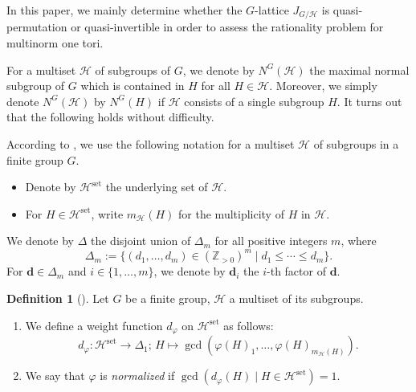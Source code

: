 \documentclass[12pt]{amsart}
\theoremstyle{plain}
\newtheorem{lem}[thm]{Lemma}
\theoremstyle{definition}
\newtheorem{dfn}[thm]{Definition}
\numberwithin{thm}{section}
\numberwithin{equation}{section}
\newcommand{\Zpn}{\mathbb{Z}_{>0}}
\newcommand{\bd}{\mathbf{d}}
\newcommand{\cH}{\mathcal{H}}
\DeclareMathOperator{\set}{set}
\begin{document}
In this paper, we mainly determine whether the $G$-lattice $J_{G/\cH}$ is quasi-permutation or quasi-invertible in order to assess the rationality problem for multinorm one tori.

For a multiset $\cH$ of subgroups of $G$, we denote by $N^{G}(\cH)$ the maximal normal subgroup of $G$ which is contained in $H$ for all $H\in \cH$. Moreover, we simply denote $N^{G}(\cH)$ by $N^{G}(H)$ if $\cH$ consists of a single subgroup $H$. It turns out that the following holds without difficulty. 

According to \cite{Hasegawa}, we use the following notation for a multiset $\cH$ of subgroups in a finite group $G$. 
\begin{itemize}
\item Denote by $\cH^{\set}$ the underlying set of $\cH$. 
\item For $H\in \cH^{\set}$, write $m_{\cH}(H)$ for the multiplicity of $H$ in $\cH$. 
\end{itemize}
We denote by $\Delta$ the disjoint union of $\Delta_{m}$ for all positive integers $m$, where
\begin{equation*}
\Delta_{m}:=\{(d_{1},\ldots,d_{m})\in (\Zpn)^{m}\mid d_{1}\leq \cdots \leq d_{m}\}. 
\end{equation*}
For $\bd \in \Delta_{m}$ and $i\in \{1,\ldots,m\}$, we denote by $\bd_{i}$ the $i$-th factor of $\bd$. 

\begin{dfn}[{\cite[Definition 3.3]{Hasegawa}}]\label{dfn:dfdp}
Let $G$ be a finite group, $\cH$ a multiset of its subgroups. 
\begin{enumerate}
\item We define a weight function $d_{\varphi}$ on $\cH^{\set}$ as follows: 
\begin{equation*}
d_{\varphi}\colon \cH^{\set} \rightarrow \Delta_{1};\,H \mapsto \gcd(\varphi(H)_{1},\ldots,\varphi(H)_{m_{\cH}(H)}). 
\end{equation*}
\item We say that $\varphi$ is \emph{normalized} if $\gcd(d_{\varphi}(H)\mid H\in \cH^{\set})=1$. 
\end{enumerate}
\end{dfn}
\end{document}
